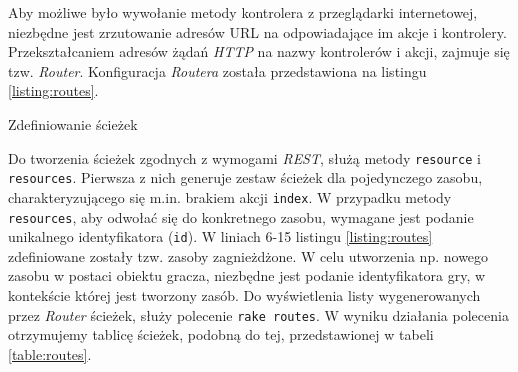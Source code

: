 \documentclass[a4paper,12pt]{article}
\begin{document}
Aby możliwe było wywołanie metody kontrolera z przeglądarki
internetowej, niezbędne jest zrzutowanie adresów URL na odpowiadające
im akcje i kontrolery. Przekształcaniem adresów żądań \emph{HTTP} na
nazwy kontrolerów i akcji, zajmuje się
tzw. \emph{Router}. Konfiguracja \emph{Routera} została przedstawiona
na listingu \ref{listing:routes}.

\begin{listing}
  
  \caption{Zdefiniowanie ścieżek}
  \label{listing:routes}
\end{listing}

Do tworzenia ścieżek zgodnych z wymogami \emph{REST}, służą metody
\texttt{resource} i \texttt{resources}. Pierwsza z nich generuje
zestaw ścieżek dla pojedynczego zasobu, charakteryzującego się
m.in. brakiem akcji \texttt{index}. W przypadku metody
\texttt{resources}, aby odwołać się do konkretnego zasobu, wymagane
jest podanie unikalnego identyfikatora (\texttt{id}). W liniach 6-15
listingu \ref{listing:routes} zdefiniowane zostały tzw. zasoby
zagnieżdżone. W celu utworzenia np. nowego zasobu w postaci obiektu
gracza, niezbędne jest podanie identyfikatora gry, w kontekście której
jest tworzony zasób. Do wyświetlenia listy wygenerowanych przez
\emph{Router} ścieżek, służy polecenie \texttt{rake routes}. W wyniku
działania polecenia otrzymujemy tablicę ścieżek, podobną do tej,
przedstawionej w tabeli \ref{table:routes}.
\end{document}
